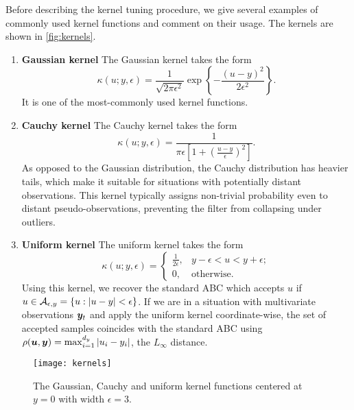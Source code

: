 Before describing the kernel tuning procedure, we give several examples of commonly used kernel functions and comment on their usage. The kernels are shown in \autoref{fig:kernels}.
\begin{enumerate}
    \item \textbf{Gaussian kernel} The Gaussian kernel takes the form
    \begin{equation*}
    \kappa(u; y, \epsilon) = \frac{1}{\sqrt{2 \pi \epsilon^2}} \exp \left\{-\frac{\left(u - y\right)^2}{2 \epsilon^2}\right\}.
    \end{equation*}
    It is one of the most-commonly used kernel functions.
    \item \textbf{Cauchy  kernel} The Cauchy kernel takes the form
    \begin{equation*}
    \kappa(u; y, \epsilon) = \frac{1}{\pi \epsilon \left[ 1 + \left(\frac{u - y}{\epsilon}\right)^2 \right]}.
    \end{equation*}
    As opposed to the Gaussian distribution, the Cauchy distribution has heavier tails, which make it suitable for situations with potentially distant observations. This kernel typically assigns non-trivial probability even to distant pseudo-observations, preventing the filter from collapsing under outliers.
    
    \item \textbf{Uniform kernel} The uniform kernel takes the form
    \begin{equation*}
    \kappa(u; y, \epsilon) = \begin{cases}
    \frac{1}{2 \epsilon}, & y - \epsilon < u < y + \epsilon; \\
    0, & \text{otherwise}.
    \end{cases}
    \end{equation*}
    Using this kernel, we recover the standard ABC which accepts $u$ if $u \in \mathcal{A}_{\epsilon, y} = \left\{u : \left| u - y \right| < \epsilon \right\}$. If we are in a situation with multivariate observations $\bm{y}_t$ and apply the uniform kernel coordinate-wise, the set of accepted samples coincides with the standard ABC using $\rho(\bm{u}, \bm{y}) = \max_{i=1}^{d_y} \left|u_i - y_i\right|$, the $L_\infty$ distance.
\end{enumerate}

\begin{figure}[ht]
    \centering
    \texttt{[image: kernels]}
    \caption{The Gaussian, Cauchy and uniform kernel functions centered at $y = 0$ with width $\epsilon = 3$.}
    \label{fig:kernels}
\end{figure}


